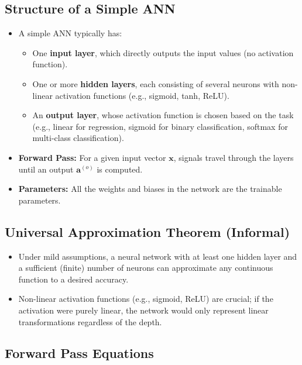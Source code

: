 \documentclass{article}
\begin{document}
\subsection{Structure of a Simple ANN}

\begin{itemize}
    \item A simple ANN typically has:
    \begin{itemize}
        \item One \textbf{input layer}, which directly outputs the input values (no activation function).
        \item One or more \textbf{hidden layers}, each consisting of several neurons with non-linear activation functions (e.g., sigmoid, tanh, ReLU).
        \item An \textbf{output layer}, whose activation function is chosen based on the task (e.g., linear for regression, sigmoid for binary classification, softmax for multi-class classification).
    \end{itemize}
    \item \textbf{Forward Pass:} For a given input vector $\mathbf{x}$, signals travel through the layers until an output $\mathbf{a}^{(o)}$ is computed.
    \item \textbf{Parameters:} All the weights and biases in the network are the trainable parameters.
\end{itemize}

\subsection{Universal Approximation Theorem (Informal)}

\begin{itemize}
    \item Under mild assumptions, a neural network with at least one hidden layer and a sufficient (finite) number of neurons can approximate any continuous function to a desired accuracy.
    \item Non-linear activation functions (e.g., sigmoid, ReLU) are crucial; if the activation were purely linear, the network would only represent linear transformations regardless of the depth.
\end{itemize}

\subsection{Forward Pass Equations}
\end{document}
